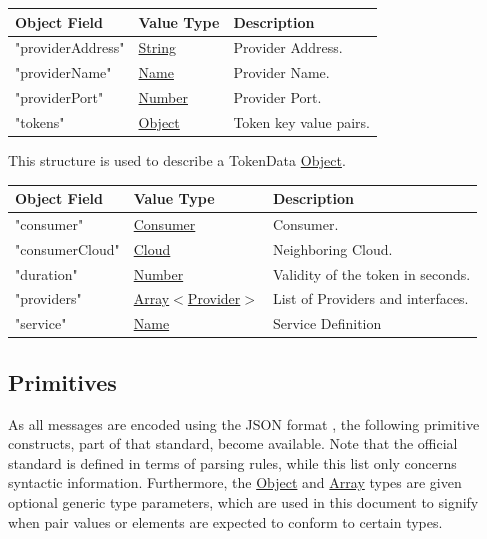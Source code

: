 \documentclass[a4paper]{arrowhead}
\newcommand{\mref}[1]{{\textcolor{ArrowheadPurple}{\hyperref[sec:model:#1]{#1}}}}
\newcommand{\pref}[1]{{\textcolor{ArrowheadGrey}{\hyperref[sec:model:primitives:#1]{#1}}}}
\begin{document}
\begin{table}[ht!]
\begin{tabularx}{\textwidth}{| p{6cm} | p{5cm} | X |} \hline
\rowcolor{gray!33} Object Field & Value Type      & Description \\ \hline
"providerAddress"           & \pref{String}       & Provider Address. \\ \hline
"providerName"              & \pref{Name}         & Provider Name. \\ \hline
"providerPort"              & \pref{Number}       & Provider Port. \\ \hline
"tokens"                    & \pref{Object}       & Token key value pairs. \\ \hline

\end{tabularx}
\end{table}


This structure is used to describe a TokenData \pref{Object}.


\begin{table}[ht!]
\begin{tabularx}{\textwidth}{| p{6cm} | p{5cm} | X |} \hline
\rowcolor{gray!33} Object Field & Value Type      & Description \\ \hline
"consumer"                   & \pref{Consumer}  & Consumer. \\ \hline
"consumerCloud"              & \pref{Cloud}     & Neighboring Cloud. \\ \hline
"duration"                   & \pref{Number}    & Validity of the token in seconds. \\ \hline
"providers"                  & \pref{Array}$<$\mref{Provider}$>$    & List of Providers and interfaces. \\ \hline
"service"                    & \pref{Name}      & Service Definition \\ \hline

\end{tabularx}
\end{table}

\subsection{Primitives}
\label{sec:model:primitives}

As all messages are encoded using the JSON format \cite{bray2014json}, the following primitive constructs, part of that standard, become available.
Note that the official standard is defined in terms of parsing rules, while this list only concerns syntactic information.
Furthermore, the \pref{Object} and \pref{Array} types are given optional generic type parameters, which are used in this document to signify when pair values or elements are expected to conform to certain types. 
\end{document}
